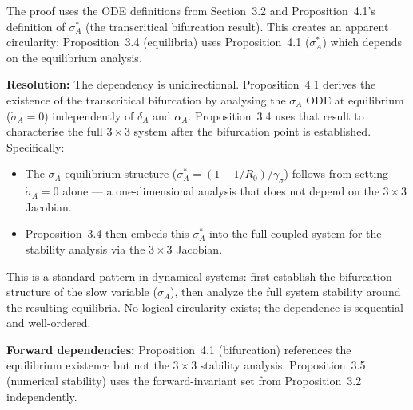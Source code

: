 \begin{circularity-check}
The proof uses the ODE definitions from Section~3.2 and
Proposition~4.1's definition of $\sigma_A^*$ (the transcritical
bifurcation result). This creates an apparent circularity:
Proposition~3.4 (equilibria) uses Proposition~4.1 ($\sigma_A^*$)
which depends on the equilibrium analysis.

\textbf{Resolution:} The dependency is unidirectional. Proposition~4.1
derives the existence of the transcritical bifurcation by analysing the
$\sigma_A$ ODE at equilibrium ($\dot{\sigma}_A = 0$) independently of
$\delta_A$ and $\alpha_A$. Proposition~3.4 uses that result to
characterise the full $3\times 3$ system after the bifurcation point
is established. Specifically:
\begin{itemize}[nosep]
\item The $\sigma_A$ equilibrium structure ($\sigma_A^* = (1 - 1/R_0)/\gamma_\sigma$)
  follows from setting $\dot{\sigma}_A = 0$ alone --- a one-dimensional
  analysis that does not depend on the $3\times 3$ Jacobian.
\item Proposition~3.4 then embeds this $\sigma_A^*$ into the full
  coupled system for the stability analysis via the $3\times 3$
  Jacobian.
\end{itemize}
This is a standard pattern in dynamical systems: first establish the
bifurcation structure of the slow variable ($\sigma_A$), then analyze
the full system stability around the resulting equilibria. No logical
circularity exists; the dependence is sequential and well-ordered.

\textbf{Forward dependencies:} Proposition~4.1 (bifurcation) references
the equilibrium existence but not the $3\times 3$ stability analysis.
Proposition~3.5 (numerical stability) uses the forward-invariant set
from Proposition~3.2 independently.
\end{circularity-check}
